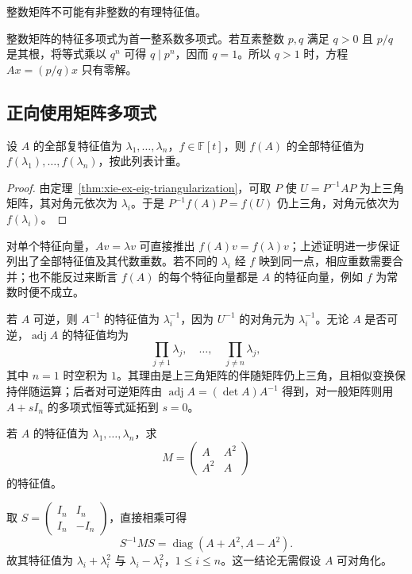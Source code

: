 \begin{example}
整数矩阵不可能有非整数的有理特征值。
\end{example}
\begin{solve}
整数矩阵的特征多项式为首一整系数多项式。若互素整数 $p,q$ 满足 $q>0$ 且 $p/q$ 是其根，将等式乘以 $q^n$ 可得 $q\mid p^n$，因而 $q=1$。所以 $q>1$ 时，方程 $Ax=(p/q)x$ 只有零解。
\end{solve}

\subsection{正向使用矩阵多项式}

\begin{theorem}
\label{thm:xie-ex-eig-spectral-mapping}
设 $A$ 的全部复特征值为 $\lambda_1,\ldots,\lambda_n$，$f\in\mathbb F[t]$，则 $f(A)$ 的全部特征值为 $f(\lambda_1),\ldots,f(\lambda_n)$，按此列表计重。
\end{theorem}
\begin{proof}
由定理~\ref{thm:xie-ex-eig-triangularization}，可取 $P$ 使 $U=P^{-1}AP$ 为上三角矩阵，其对角元依次为 $\lambda_i$。于是 $P^{-1}f(A)P=f(U)$ 仍上三角，对角元依次为 $f(\lambda_i)$。
\end{proof}

对单个特征向量，$Av=\lambda v$ 可直接推出 $f(A)v=f(\lambda)v$；上述证明进一步保证列出了全部特征值及其代数重数。若不同的 $\lambda_i$ 经 $f$ 映到同一点，相应重数需要合并；也不能反过来断言 $f(A)$ 的每个特征向量都是 $A$ 的特征向量，例如 $f$ 为常数时便不成立。

若 $A$ 可逆，则 $A^{-1}$ 的特征值为 $\lambda_i^{-1}$，因为 $U^{-1}$ 的对角元为 $\lambda_i^{-1}$。无论 $A$ 是否可逆，$\operatorname{adj}A$ 的特征值均为
\[
\prod_{j\ne1}\lambda_j,\quad\ldots,\quad\prod_{j\ne n}\lambda_j,
\]
其中 $n=1$ 时空积为 $1$。其理由是上三角矩阵的伴随矩阵仍上三角，且相似变换保持伴随运算；后者对可逆矩阵由 $\operatorname{adj}A=(\det A)A^{-1}$ 得到，对一般矩阵则用 $A+sI_n$ 的多项式恒等式延拓到 $s=0$。

\begin{example}
若 $A$ 的特征值为 $\lambda_1,\ldots,\lambda_n$，求
\[
M=\begin{pmatrix}A&A^2\\A^2&A\end{pmatrix}
\]
的特征值。
\end{example}
\begin{solve}
取 $S=\begin{pmatrix}I_n&I_n\\I_n&-I_n\end{pmatrix}$，直接相乘可得
\[
S^{-1}MS=\operatorname{diag}(A+A^2,A-A^2).
\]
故其特征值为 $\lambda_i+\lambda_i^2$ 与 $\lambda_i-\lambda_i^2$，$1\le i\le n$。这一结论无需假设 $A$ 可对角化。
\end{solve}


